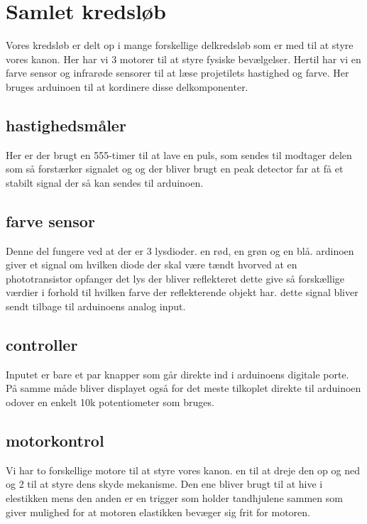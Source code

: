 \section{Samlet kredsløb}
Vores kredsløb er delt op i mange forskellige delkredsløb som er med til at styre vores kanon. Her har vi 3 motorer til at styre fysiske bevælgelser. Hertil har vi en farve sensor og infrarøde sensorer til at læse projetilets hastighed og farve. Her bruges arduinoen til at kordinere disse delkomponenter.


\subsection{hastighedsmåler}
Her er der brugt en 555-timer til at lave en puls, som sendes til modtager delen som så forstærker signalet og og der bliver brugt en peak detector far at få et stabilt signal der så kan sendes til arduinoen.
 \subsection{farve sensor}
Denne del fungere ved at der er 3 lysdioder. en rød, en grøn og en blå. ardinoen giver et signal om hvilken diode der skal være tændt hvorved at en phototransistor opfanger det lys der bliver reflekteret dette give så forskællige værdier i forhold til hvilken farve der reflekterende objekt har. dette signal bliver sendt tilbage til arduinoens analog input.
\subsection{controller}
Inputet er bare et par knapper som går direkte ind i arduinoens digitale porte.
På samme måde bliver displayet også for det meste tilkoplet direkte til arduinoen odover en enkelt 10k potentiometer som bruges.
\subsection{motorkontrol}

Vi har to forskellige motore til at styre vores kanon. en til at dreje den op og ned og 2 til at styre dens skyde mekanisme. Den ene bliver brugt til at hive i elestikken mens den anden er en trigger som holder tandhjulene sammen som giver mulighed for at motoren elastikken bevæger sig frit for motoren.

